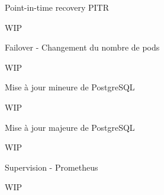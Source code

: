
\begin{frame}[fragile]{Point-in-time recovery PITR}

   WIP

\end{frame}


\begin{frame}[fragile]{Failover - Changement du nombre de pods}

   WIP

\end{frame}


\begin{frame}[fragile]{Mise à jour mineure de PostgreSQL}

   WIP

\end{frame}


\begin{frame}[fragile]{Mise à jour majeure de PostgreSQL}

   WIP

\end{frame}


\begin{frame}[fragile]{Supervision - Prometheus}

   WIP

\end{frame}

